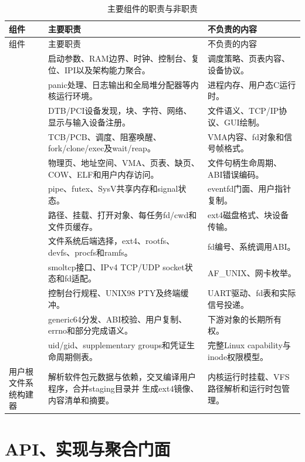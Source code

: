 \begin{longtable}{L{3.4cm}L{6.6cm}L{3.3cm}}
  \caption{主要组件的职责与非职责}\label{tab:component-responsibility}\\
  \toprule
  组件 & 主要职责 & 不负责的内容 \\
  \midrule
  \endfirsthead
  \toprule
  组件 & 主要职责 & 不负责的内容 \\
  \midrule
  \endhead
   & 启动参数、RAM边界、时钟、控制台、复位、IPI以及架构能力聚合。 &
  调度策略、页表内容、设备协议。\\
   & panic处理、日志输出和全局堆分配器等内核运行环境。 &
  进程内存、用户态C运行时。\\
   & DTB/PCI设备发现，块、字符、网络、显示与输入设备注册。 &
  文件语义、TCP/IP协议、GUI绘制。\\
   & TCB/PCB、调度、阻塞唤醒、fork/clone/exec及wait/reap。 &
  VMA内容、fd对象和信号帧格式。\\
   & 物理页、地址空间、VMA、页表、缺页、COW、ELF和用户内存访问。 &
  文件句柄生命周期、ABI错误编码。\\
   & pipe、futex、SysV共享内存和signal状态。 &
  eventfd门面、用户指针复制。\\
   & 路径、挂载、打开对象、每任务fd/cwd和文件页缓存。 &
  ext4磁盘格式、块设备传输。\\
   & 文件系统后端选择，ext4、rootfs、devfs、procfs和ramfs。 &
  fd编号、系统调用ABI。\\
   & smoltcp接口、IPv4 TCP/UDP socket状态和fd适配。 &
  AF\_UNIX、网卡枚举。\\
   & 控制台行规程、UNIX98 PTY及终端缓冲。 &
  UART驱动、fd表和实际信号投递。\\
   & generic64分发、ABI校验、用户复制、errno和部分完成语义。 &
  下游对象的长期所有权。\\
   & uid/gid、supplementary groups和凭证生命周期侧表。 &
  完整Linux capability与inode权限模型。\\
  用户根文件系统构建器 & 解析软件包元数据与依赖，交叉编译用户程序，合并staging目录并
  生成ext4镜像、内容清单和摘要。 & 内核运行时挂载、VFS路径解析和运行时包管理。\\
  \bottomrule
\end{longtable}

\section{API、实现与聚合门面}


